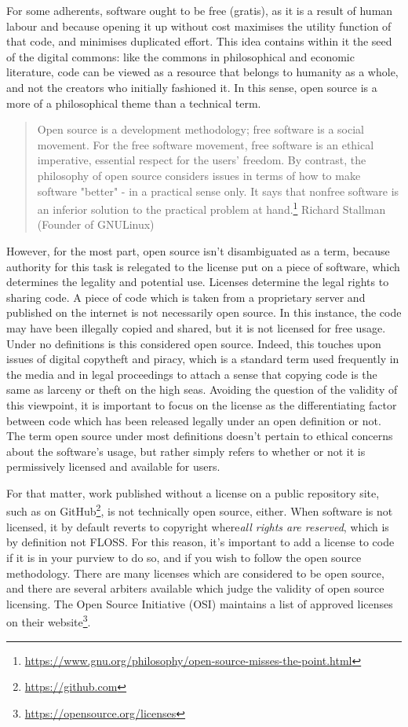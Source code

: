 For some adherents, software ought to be free (gratis), as it is a result of human labour and because opening it up without cost maximises the utility function of that code, and minimises duplicated effort. This idea contains within it the seed of the digital commons: like the commons in philosophical and economic literature, code can be viewed as a resource that belongs to humanity as a whole, and not the creators who initially fashioned it. In this sense, open source is a more of a philosophical theme than a technical term.

\begin{quote}
Open source is a development methodology; free software is a social movement. For the free software movement, free software is an ethical imperative, essential respect for the users' freedom. By contrast, the philosophy of open source considers issues in terms of how to make software  "better" - in a practical sense only. It says that nonfree software is an inferior solution to the practical problem at hand.\footnote{\href{https://www.gnu.org/philosophy/open-source-misses-the-point.html}{https://www.gnu.org/philosophy/open-source-misses-the-point.html}}
\signed Richard Stallman (Founder of GNU\/Linux)
\end{quote}

However, for the most part, open source isn't disambiguated as a term, because authority for this task is relegated to the license put on a piece of software, which determines the legality and potential use. Licenses determine the legal rights to sharing code. A piece of code which is taken from a proprietary server and published on the internet is not necessarily open source. In this instance, the code may have been illegally copied and shared, but it is not licensed for free usage. Under no definitions is this considered open source. Indeed, this touches upon issues of digital copytheft and piracy, which is a standard term used frequently in the media and in legal proceedings to attach a sense that copying code is the same as larceny or theft on the high seas. Avoiding the question of the validity of this viewpoint, it is important to focus on the license as the differentiating factor between code which has been released legally under an open definition or not. The term open source under most definitions doesn't pertain to ethical concerns about the software's usage, but rather simply refers to whether or not it is permissively licensed and available for users.

For that matter, work published without a license on a public repository site, such as on GitHub\footnote{\href{https://github.com}{https://github.com}}, is not technically open source, either. When software is not licensed, it by default reverts to copyright where{\it all rights are reserved}, which is by definition not FLOSS. For this reason, it's important to add a license to code if it is in your purview to do so, and if you wish to follow the open source methodology. There are many licenses which are considered to be open source, and there are several arbiters available which judge the validity of open source licensing. The Open Source Initiative (OSI) maintains a list of approved licenses on their website\footnote{\href{https://opensource.org/licenses}{https://opensource.org/licenses}}.

